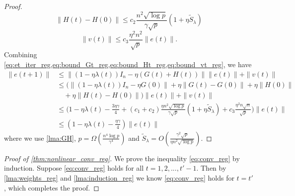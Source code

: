 \begin{proof}
\begin{equation}\label{eq:bound_Ht_reg}
    \|H(t)-H(0)\| \leq c_2\frac{n^2\sqrt{\log p}}{\gamma\sqrt p}(1+\eta \tilde{S}_\lambda)
\end{equation}
\begin{equation}\label{eq:bound_vt_reg}
    \|v(t)\| \leq c_3\frac{\eta^2n^2}{\sqrt p}\|e(t)\|.
\end{equation}
Combining \cref{eq:et_iter_reg,eq:bound_Gt_reg,eq:bound_Ht_reg,eq:bound_vt_reg}, we have
\begin{equation*}
\begin{aligned}
\|e(t+1)\|
&\leq \|(1-\eta\lambda(t))I_n-\eta (G(t)+H(t))\|\|e(t)\|+\|v(t)\| \\
&\leq \Big(\|(1-\eta\lambda(t))I_n-\eta G(0)\|+\eta\|G(t)-G(0)\|+\eta\|H(0)\| \\
&\quad +\eta\|H(t)-H(0)\|\Big)\|e(t)\| + \|v(t)\| \\
&\leq \Big( 1-\eta\lambda(t)-\frac{3\eta\gamma}{4}+(c_1+ c_2)\frac{\eta n^2\sqrt{\log p}}{\gamma\sqrt p}(1+\eta \tilde{S}_\lambda)+c_3\frac{\eta^2n\sqrt n}{\sqrt p}\Big)\|e(t)\|  \\
&\leq(1-\eta\lambda(t)-\frac{\eta\gamma}{4})\|e(t)\|
\end{aligned}
\end{equation*}
where we use \cref{lma:GH}, $p=\Omega(\frac{n^4\log p}{\gamma^4})$ and $\tilde{S}_\lambda = O(\frac{\gamma^2\sqrt{p}}{\eta n^2\sqrt{\log p}})$.
\end{proof}

\begin{proof}[Proof of \cref{thm:nonlinear_conv_reg}]
We prove the inequality \eqref{eq:conv_reg} by induction. Suppose \eqref{eq:conv_reg} holds for all $t=1,2,...,t'-1$. Then by \cref{lma:weights_reg} and \cref{lma:induction_reg} we know \eqref{eq:conv_reg} holds for $t=t'$, which completes the proof.
\end{proof}
